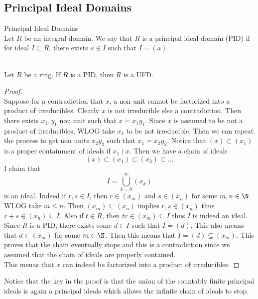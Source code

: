 \documentclass[a4paper]{article}
\begin{document}
\subsection{Principal Ideal Domains}
\begin{defn}{Principal Ideal Domains}{}\\
Let $R$ be an integral domain. We say that $R$ is a principal ideal domain (PID) if for ideal $I\subseteq R$, there exists $a\in I$ such that $I=(a)$. 
\end{defn}

\begin{prp}{}{}\\
Let $R$ be a ring. If $R$ is a PID, then $R$ is a UFD. 
\begin{proof}\\
Suppose for a contradiction that $x$, a non-unit cannot be factorized into a product of irreducibles. Clearly $x$ is not irreducible else a contradiction. Then there exists $x_1,y_1$ non unit such that $x=x_1y_1$. Since $x$ is assumed to be not a product of irreducibles, WLOG take $x_1$ to be not irreducible. Then we can repeat the process to get non units $x_2y_2$ such that $x_1=x_2y_2$. Notice that $(x)\subset(x_1)$ is a proper containment of ideals if $x_1\;|\;x$. Then we have a chain of ideals $$(x)\subset(x_1)\subset(x_2)\subset\dots$$ I claim that $$I=\bigcup_{k=0}^\infty(x_k)$$ is an ideal. Indeed if $r,s\in I$, then $r\in(x_m)$ and $s\in(x_n)$ for some $m,n\in\N$. WLOG take $m\leq n$. Then $(x_m)\subseteq(x_n)$ implies $r,s\in(x_n)$ thus $r+s\in(x_n)\subseteq I$. Also if $t\in R$, then $tr\in(x_m)\subseteq I$ thus $I$ is indeed an ideal. \\
Since $R$ is a PID, there exists some $d\in I$ such that $I=(d)$. This also means that $d\in(x_m)$ for some $m\in\N$. Then this means that $I=(d)\subseteq(x_m)$. This proves that the chain eventually stops and this is a contradiction since we assumed that the chain of ideals are properly contained. \\
This menas that $x$ can indeed be factorized into a product of irreducibles. 
\end{proof}
\end{prp}

Notice that the key in the proof is that the union of the countably finite principal ideals is again a principal ideals which allows the infinite chain of ideals to stop. 
\end{document}
